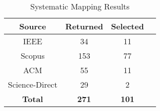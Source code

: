 	\begin{table}[htbp]
		\centering
		\caption{Systematic Mapping Results}
		\label{tab:resultados}
		\begin{tabular}{|c|c|c|c|}
		\hline
		\textbf{Source} & \textbf{Returned} & \textbf{Selected} \\ \hline
			IEEE & 34 &  11  \\ \hline
			Scopus & 153 &  77  \\ \hline
			ACM & 55 &  11  \\ \hline
			Science-Direct & 29 & 2  \\ \hline
			\textbf{Total} & \textbf{271} & \textbf{101} \\ \hline
		\end{tabular}
	\end{table}


